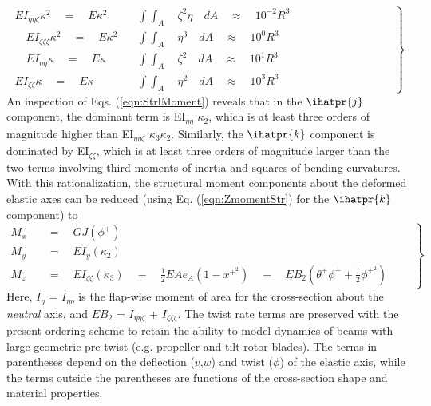 \begin{equation}
\label{eqn:relativemags}
\left.
\begin{aligned}
EI_{\eta \eta \zeta} \kappa^2 \quad = \quad E \kappa^2 \quad & \int \int_A \quad \zeta^2 \eta \quad dA \quad \approx \quad 10^{-2} R^3  \\
\quad EI_{\zeta \zeta \zeta} \kappa^2 \quad = \quad E \kappa^2 \quad & \int \int_A \quad \eta^3 \quad dA \quad \approx \quad 10^{0} R^3  \\
\quad EI_{\eta \eta} \kappa \quad = \quad E \kappa \quad & \int \int_A \quad \zeta^2 \quad dA \quad \approx \quad 10^{1} R^3 \qquad \qquad \qquad \qquad \qquad \\
EI_{\zeta \zeta} \kappa \quad =  \quad E \kappa \quad & \int \int_A \quad \eta^2 \quad dA \quad \approx \quad 10^3 R^3 
\end{aligned}
\right\}
\end{equation}
An inspection of Eqs. (\ref{eqn:StrlMoment}) reveals that in the $\ihatpr{j}$ component, the dominant term is EI$_{\eta \eta}$ $\kappa_2$, which is at least three orders of magnitude higher than EI$_{\eta \eta \zeta}$ $\kappa_3 \kappa_2$.  
Similarly, the $\ihatpr{k}$ component is dominated by EI$_{\zeta\zeta}$, which is at least three orders of magnitude larger than the two terms involving third moments of inertia and squares of bending curvatures. With this rationalization, the structural moment components about the deformed elastic axes can be reduced (using Eq. (\ref{eqn:ZmomentStr}) for the $\ihatpr{k}$ component) to
\begin{equation}
\left.
\label{eqn:StrlMomentDeformed}
\begin{aligned}
M_x \quad &= \quad G J (\phi^+) \\
M_y \quad &= \quad E I_y (\kappa_2) \\
M_z \quad &= \quad E I_{\zeta \zeta} (\kappa_3) \quad - \quad \frac{1}{2} E A e_A \left(1 - x^{+^2} \right) \quad - \quad EB_2 \left(\theta^+ \phi^+ + \frac{1}{2}\phi^{+^2}\right) \qquad
\end{aligned}
\right\}
\end{equation}
Here, $I_y$ = $I_{\eta \eta}$ is the flap-wise moment of area for the cross-section about the \emph{neutral} axis, and $EB_2$ = $I_{\eta \eta \zeta}$ + $I_{\zeta\zeta\zeta}$. The twist rate terms are preserved with the present ordering scheme to retain the ability to model dynamics of beams with large geometric pre-twist (e.g. propeller and tilt-rotor blades). The terms in parentheses depend on the deflection ($v$,$w$) and twist ($\phi$) of the elastic axis, while the terms outside the parentheses are functions of the cross-section shape and material properties. 

